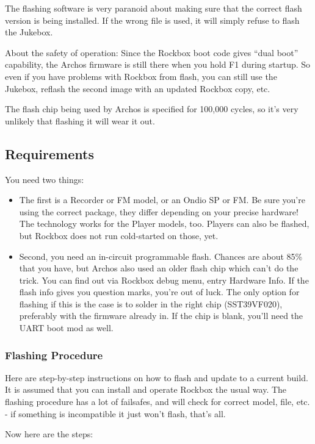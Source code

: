 The flashing software is very paranoid about making sure that the
correct flash version is being installed.  If the wrong file is used,
it will simply refuse to flash the Jukebox.

About the safety of operation: Since the Rockbox boot code gives ``dual
boot'' capability, the Archos firmware is still there when you hold F1
during startup. So even if you have problems with Rockbox from flash, you can still use
the Jukebox, reflash the second image with an updated Rockbox copy,
etc. 

The flash chip being used by Archos is specified for 100,000 cycles, so
it's very unlikely that flashing it will wear it out. 

\subsection{\label{ref:Requirements}Requirements}
You need two things: 

\begin{itemize}
\item The first is a Recorder or FM model, or an Ondio SP or FM. Be sure
you're using the correct package, they differ
depending on your precise hardware! The technology works for the Player
models, too. Players can also be flashed, but Rockbox does not run
cold{}-started on those, yet. 
\item Second, you need an in{}-circuit programmable flash. Chances are
about 85\% that you have, but Archos also used an older flash chip
which can't do the trick. You can find out via Rockbox
debug menu, entry Hardware Info. If the flash info gives you question
marks, you're out of luck. The only option for
flashing if this is the case is to solder in the right chip
(SST39VF020), preferably with the firmware already in. If the chip is
blank, you'll need the UART boot mod as well. 
\end{itemize}
\subsubsection{\label{ref:FlashingProcedure}Flashing Procedure}
Here are step{}-by{}-step instructions on how to flash and update to a
current build.  It is assumed that you can install and operate Rockbox
the usual way. The flashing procedure has a lot of failsafes, and will
check for correct model, file, etc. {}- if something is incompatible it
just won't flash, that's all. 

Now here are the steps: 

